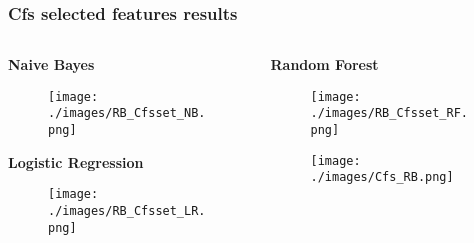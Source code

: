 \documentclass[10pt]{beamer}
\begin{document}
\begin{frame}[c, squeeze] \frametitle{Cfs selected features results}
 \scriptsize
 \begin{columns}\begin{column}{0.5\textwidth}
\begin{center}
 \textbf{Naive Bayes} 
 \begin{figure}
 \centering
 \texttt{[image: ./images/RB\_Cfsset\_NB.png]}
\end{figure}

\textbf{Logistic Regression} %
\begin{figure}
 \centering
 \texttt{[image: ./images/RB\_Cfsset\_LR.png]}
\end{figure}
\end{center}
\end{column}
\begin{column}{0.5\textwidth}
\begin{center}
\textbf{Random Forest} %
\begin{figure}
 \centering
 \texttt{[image: ./images/RB\_Cfsset\_RF.png]}
\end{figure}
\begin{figure}
 \centering
 \texttt{[image: ./images/Cfs\_RB.png]}
\end{figure}
\end{center} 
\end{column}
\end{columns}
\end{frame}

\end{document}
